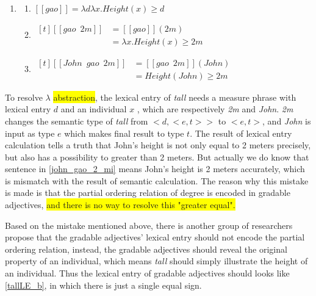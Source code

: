 \documentclass{ctexart}
\begin{document}
\begin{enumerate}[resume]
    \item \label{john_gao_2_mi_LE}
    
    \begin{enumerate}[ref=(\arabic{enumi}\alph*)]
    \item \label{john_gao_2_mi_LE_a} 
    $[\![gao]\!] = \lambda d \lambda x.Height(x) \geq d$
    
    \item \label{john_gao_2_mi_LE_b} 
    $\begin{aligned}[t]
        [\![gao \enspace 2m]\!] &= [\![gao]\!](2m) \\
        &= \lambda x.Height(x) \geq 2m
    \end{aligned}$
    
    \item \label{john_gao_2_mi_LE_c} 
    $\begin{aligned}[t]
        [\![John \enspace gao \enspace 2m]\!] &= [\![gao \enspace 2m]\!](John) \\
        &= Height(John) \geq 2m
    \end{aligned}$
    
    \end{enumerate}
\end{enumerate}

To resolve $\lambda$ \colorbox{yellow}{abstraction}, the lexical entry of \textit{tall} needs a measure phrase with lexical entry $d$ and an individual $x$ , which are respectively \textit{2m} and \textit{John}. \textit{2m} changes the semantic type of \textit{tall} from $<d,<e,t>>$ to $<e,t>$, and \textit{John} is input as type $e$ which makes final result to type $t$. The result of lexical entry calculation tells a truth that John's height is not only equal to 2 meters precisely, but also has a possibility to greater than 2 meters. But actually we do know that sentence in \ref{john_gao_2_mi} means John's height is 2 meters accurately, which is mismatch with the result of semantic calculation. The reason why this mistake is made is that the partial ordering relation of degree is encoded in gradable adjectives, \colorbox{yellow}{and there is no way to resolve this "greater equal".}

Based on the mistake mentioned above, there is another group of researchers propose that the gradable adjectives' lexical entry should not encode the partial ordering relation, instead, the gradable adjectives should reveal the original property of an individual, which means \textit{tall} should simply illustrate the height of an individual. Thus the lexical entry of gradable adjectives should looks like \ref{tallLE_b}, in which there is just a single equal sign. 
\end{document}
